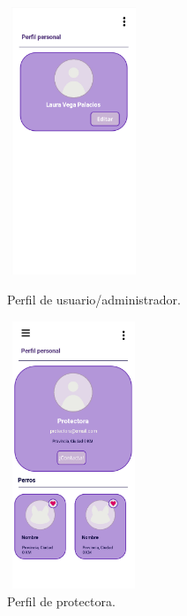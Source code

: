 \documentclass[a4paper, 12pt]{article}
\begin{document}
\begin{figure}[H]
   	\begin{minipage}{0.48\textwidth}
		\begin{center}
			{\includegraphics[height=8cm, width=4cm]{design/UserProfile.jpg}\par}
			\caption{Perfil de usuario/administrador.}
			\medskip

		\end{center}  
	\end{minipage}\hfill
   	\begin{minipage}{0.48\textwidth}
		\begin{center}
			{\includegraphics[height=8cm, width=4cm]{design/CompanyProfile.jpg}\par}
			\caption{Perfil de protectora. }
			\medskip
		\end{center}  
	\end{minipage}\hfill
\end{figure}
\end{document}
